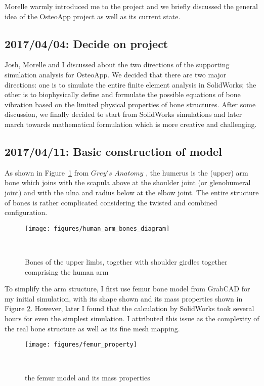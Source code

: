 \documentclass{sigchi}
\begin{document}
Morelle warmly introduced me to the project and we briefly discussed the general idea of the OsteoApp project as well as its current state. 

\subsection{2017/04/04: Decide on project}

Josh, Morelle and I discussed about the two directions of the supporting simulation analysis for OsteoApp. We decided that there are two major directions: one is to simulate the entire finite element analysis in SolidWorks; the other is to biophysically define and formulate the possible equations of bone vibration based on the limited physical properties of bone structures. 
After some discussion, we finally decided to start from SolidWorks simulations and later march towards mathematical formulation which is more creative and challenging.

\subsection{2017/04/11: Basic construction of model}

As shown in Figure~\ref{fig:arm_diagram} from $Grey's$ $Anatomy$ \cite{WikipediaEN:Arm}, the humerus is the (upper) arm bone which joins with the scapula above at the shoulder joint (or glenohumeral joint) and with the ulna and radius below at the elbow joint. The entire structure of bones is rather complicated considering the twisted and combined configuration.


\begin{figure}
\centering
  \texttt{[image: figures/human\_arm\_bones\_diagram]}
  \caption{Bones of the upper limbs, together with shoulder girdles together comprising the human arm}~\label{fig:arm_diagram}
\end{figure}


To simplify the arm structure, I first use femur bone model from GrabCAD \cite{SB:bone} for my initial simulation, with its shape shown and its mass properties shown in Figure \ref{fig:femur_property}. However, later I found that the calculation by SolidWorks took several hours for even the simplest simulation. I attributed this issue as the complexity of the real bone structure as well as its fine mesh mapping. 


\begin{figure}
\centering
  \texttt{[image: figures/femur\_property]}
  \caption{the femur model and its mass properties }~\label{fig:femur_property}
\end{figure}
\end{document}
